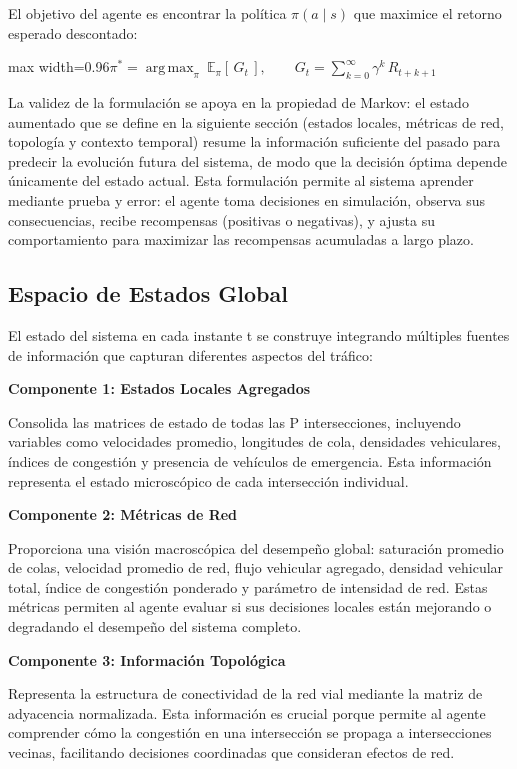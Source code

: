 \documentclass[12pt,a4paper,oneside]{report}
\newenvironment{centeredmath}
  {\begin{center}\begin{adjustbox}{max width=0.96\linewidth}\(\displaystyle}
  {\)\end{adjustbox}\end{center}}
\begin{document}
El objetivo del agente es encontrar la política \(\pi(a \mid s)\) que maximice el retorno esperado descontado:

\begin{centeredmath}
\pi^{*} = \operatorname*{arg\,max}_{\pi}\ \mathbb{E}_{\pi}\!\left[\, G_{t} \,\right], \qquad
G_{t} = \sum_{k = 0}^{\infty}\gamma^{k}\, R_{t + k + 1}
\end{centeredmath}

La validez de la formulación se apoya en la propiedad de Markov: el estado aumentado que se define en la siguiente sección (estados locales, métricas de red, topología y contexto temporal) resume la información suficiente del pasado para predecir la evolución futura del sistema, de modo que la decisión óptima depende únicamente del estado actual. Esta formulación permite al sistema aprender mediante prueba y error: el agente toma decisiones en simulación, observa sus consecuencias, recibe recompensas (positivas o negativas), y ajusta su comportamiento para maximizar las recompensas acumuladas a largo plazo.

\subsection{Espacio de Estados Global}\label{espacio-de-estados-global}

El estado del sistema en cada instante t se construye integrando múltiples fuentes de información que capturan diferentes aspectos del tráfico:

\textbf{Componente 1: Estados Locales Agregados}

Consolida las matrices de estado de todas las P intersecciones, incluyendo variables como velocidades promedio, longitudes de cola, densidades vehiculares, índices de congestión y presencia de vehículos de emergencia. Esta información representa el estado microscópico de cada intersección individual.

\textbf{Componente 2: Métricas de Red}

Proporciona una visión macroscópica del desempeño global: saturación promedio de colas, velocidad promedio de red, flujo vehicular agregado, densidad vehicular total, índice de congestión ponderado y parámetro de intensidad de red. Estas métricas permiten al agente evaluar si sus decisiones locales están mejorando o degradando el desempeño del sistema completo.

\textbf{Componente 3: Información Topológica}

Representa la estructura de conectividad de la red vial mediante la matriz de adyacencia normalizada. Esta información es crucial porque permite al agente comprender cómo la congestión en una intersección se propaga a intersecciones vecinas, facilitando decisiones coordinadas que consideran efectos de red.
\end{document}
